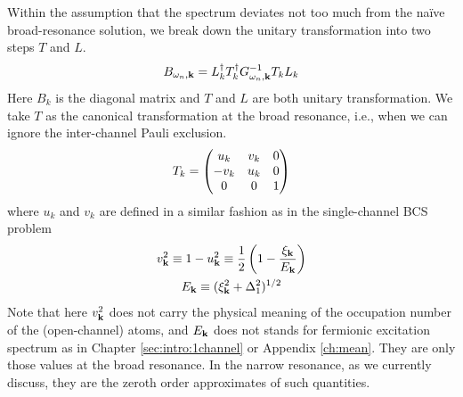 Within the assumption that the spectrum  deviates not too much from the na\"{i}ve broad-resonance solution, we  break down the unitary transformation into two steps $T$ and $L$. 
\begin{equation}\label{eq:pathInt2:B}
B_{\omega_{n},\mathbf{k}}=L_k^{\dagger}T_k^{\dagger}G_{\omega_{n},\mathbf{k}}^{-1}T_kL_k
\end{equation} 
Here $B_{k}$ is the diagonal matrix and $T$ and $L$ are both unitary transformation.  We take $T$ as the canonical transformation at the broad resonance, i.e., when we can ignore the inter-channel Pauli exclusion. 
\begin{equation}\label{eq:pathInt2:T}
T_k=\begin{pmatrix}u_k&v_k&0\\-v_k&u_k&0\\0&0&1\end{pmatrix}
\end{equation}
where $u_{k}$ and $v_{k}$ are defined in a similar fashion as in the single-channel BCS  problem
\begin{gather}
v_{\mathbf{k}}^{2}\equiv1-u_{\mathbf{k}}^{2}\equiv\frac{1}{2}\left(1-\frac{\xi_{\mathbf{k}}}{E_{\mathbf{k}}}\right)\\
E_{\mathbf{k}}\equiv(\xi_{\mathbf{k}}^{2}+\Delta_{1}^{2})^{1/2}
\end{gather}
Note that here $v_{\mathbf{k}}^{2}$  does not carry the physical meaning of the occupation number of the (open-channel) atoms, and $E_{\mathbf{k}}$   does not stands for fermionic excitation spectrum as in Chapter \ref{sec:intro:1channel} or Appendix \ref{ch:mean}.   They are only those values at the broad resonance. In the narrow resonance, as we currently discuss, they are the zeroth order approximates of such quantities. 

